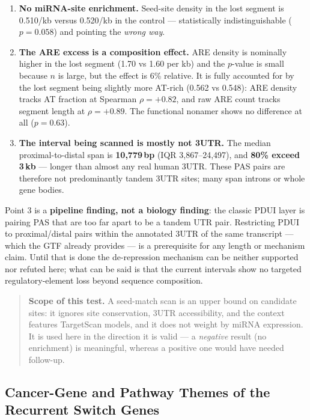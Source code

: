\documentclass[11pt,a4paper]{article}
\begin{document}
\begin{enumerate}
  \item \textbf{No miRNA-site enrichment.} Seed-site density in the lost segment is
    0.510/kb versus 0.520/kb in the control --- statistically indistinguishable
    ($p = 0.058$) and pointing the \emph{wrong way}.
  \item \textbf{The ARE excess is a composition effect.} ARE density is nominally
    higher in the lost segment (1.70 vs 1.60 per kb) and the $p$-value is small
    because $n$ is large, but the effect is 6\% relative. It is fully accounted for
    by the lost segment being slightly more AT-rich (0.562 vs 0.548): ARE density
    tracks AT fraction at Spearman $\rho = +0.82$, and raw ARE count tracks segment
    length at $\rho = +0.89$. The functional nonamer shows no difference at all
    ($p = 0.63$).
  \item \textbf{The interval being scanned is mostly not 3\textquotesingle{}UTR.}
    The median proximal-to-distal span is \textbf{10,779\,bp} (IQR 3,867--24,497),
    and \textbf{80\% exceed 3\,kb} --- longer than almost any real human
    3\textquotesingle{}UTR. These PAS pairs are therefore not predominantly tandem
    3\textquotesingle{}UTR sites; many span introns or whole gene bodies.
\end{enumerate}

Point 3 is a \textbf{pipeline finding, not a biology finding}: the classic PDUI
layer is pairing PAS that are too far apart to be a tandem UTR pair. Restricting
PDUI to proximal/distal pairs within the annotated 3\textquotesingle{}UTR of the
same transcript --- which the GTF already provides --- is a prerequisite for any
length or mechanism claim. Until that is done the de-repression mechanism can be
neither supported nor refuted here; what can be said is that the current intervals
show no targeted regulatory-element loss beyond sequence composition.

\begin{quote}
\textbf{Scope of this test.} A seed-match scan is an upper bound on candidate
sites: it ignores site conservation, 3\textquotesingle{}UTR accessibility, and the
context features TargetScan models, and it does not weight by miRNA expression. It
is used here in the direction it is valid --- a \emph{negative} result (no
enrichment) is meaningful, whereas a positive one would have needed follow-up.
\end{quote}

\subsection{Cancer-Gene and Pathway Themes of the Recurrent Switch Genes}
\end{document}
